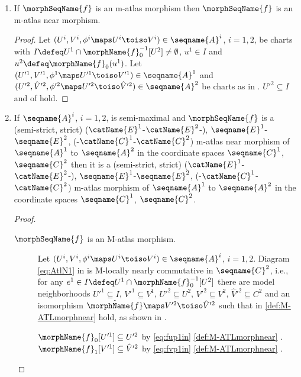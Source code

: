 \documentclass{article}
\begin{document}
\begin{lemma}
\begin{enumerate}
\item
\label{M-ATLmorph:morphisnear}
If $\morphSeqName{f}$ is an m-atlas morphism then $\morphSeqName{f}$ is an
m-atlas near morphism.

\begin{proof}
Let
$(U^i, V^i, \phi^i \maps U^i \toiso V^i) \in \seqname{A}^i$, $i=1,2$,
be charts with
$I \defeq U^1 \cap \morphName{f}^{-1}_0[U^2] \neq \emptyset$,
$u^1 \in I$ and
$u^2 \defeq \morphName{f}_0(u^1)$.
Let
$
  (U'^1, V'^1, \phi^1 \maps U'^1 \toiso V'^1)
  \in \seqname{A}^1
$
and
$
  (U'^2 ,\hat{V}'^2, \phi'^2 \maps U'^2 \toiso \hat{V}'^2)
  \in \seqname{A}^2
$
be charts as in . $U'^2 \subseteq I$ and
 of 
hold.
\end{proof}

\item
\label{M-ATLmorph:semimaxnearismorph}
If $\seqname{A}^i$, $i=1,2$, is semi-maximal and $\morphSeqName{f}$ is a
(semi-strict, strict)
\nobreaks
  {
    {($\catName{E}^1$-$\catName{E}^2$-)},
    {$\seqname{E}^1$-$\seqname{E}^2$},
    {(-$\catName{C}^1$-$\catName{C}^2$)}
  }
m-atlas near morphism of $\seqname{A}^1$ to $\seqname{A}^2$ in the
coordinate spaces $\seqname{C}^1$, $\seqname{C}^2$ then it is a
(semi-strict, strict)
\nobreaks
  {
    {($\catName{E}^1$-$\catName{E}^2$-)},
    {$\seqname{E}^1$-$\seqname{E}^2$},
    {(-$\catName{C}^1$-$\catName{C}^2$)}
  }
m-atlas morphism of $\seqname{A}^1$ to $\seqname{A}^2$ in the coordinate
spaces $\seqname{C}^1$, $\seqname{C}^2$.

\begin{proof}
\leavevmode
\begin{description}
\item [$\morphSeqName{f}$ is an M-atlas morphism.]
Let $(U^i, V^i, \phi^i \maps U^i \toiso V^i) \in \seqname{A}^i$,
$i=1,2$.  Diagram \eqref{eq:AtlN1} in  is
M-locally nearly commutative in $\seqname{C}^2$, i.e., for any
$e^1 \in I \defeq U^1 \cap \morphName{f}^{-1}_0[U^2]$ there are model
neighborhoods $U'^1 \subseteq I$, $V'^1 \subseteq V^1$,
$U'^2 \subseteq U^2$, $V'^2 \subseteq V^2$, $\hat{V}'^2 \subseteq C^2$
and an isomorphism $\hat{\morphName{f}} \maps V'^2 \toiso \hat{V}'^2$
such that  in
{
  \showlabelsinline
  \cref{def:M-ATLmorphnear}
}
hold, as shown in
{
  \showlabelsinline
  .
}

$\morphName{f}_0[U'^1] \subseteq U'^2$
by \cref{eq:fup1in}
{
  \showlabelsinline
  \cref{def:M-ATLmorphnear}
}.
$\morphName{f}_1[V'^1] \subseteq \hat{V}'^2$
by \cref{eq:fvp1in}
{
  \showlabelsinline
  \cref{def:M-ATLmorphnear}
}.


\end{description}
\end{proof}
\end{enumerate}
\end{lemma}
\end{document}
